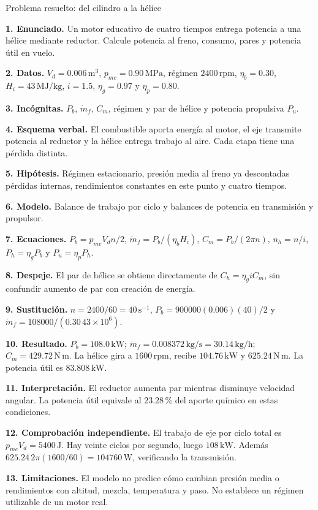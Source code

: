 \begin{studiumworked}{Problema resuelto: del cilindro a la hélice}

\textbf{1. Enunciado.} Un motor educativo de cuatro tiempos entrega potencia a una hélice mediante reductor. Calcule potencia al freno, consumo, pares y potencia útil en vuelo.

\textbf{2. Datos.} $V_d=0.006\,\mathrm{m^3}$, $p_{me}=0.90\,\mathrm{MPa}$, régimen $2400\,\mathrm{rpm}$, $\eta_b=0.30$, $H_i=43\,\mathrm{MJ/kg}$, $i=1.5$, $\eta_g=0.97$ y $\eta_p=0.80$.

\textbf{3. Incógnitas.} $P_b$, $\dot m_f$, $C_m$, régimen y par de hélice y potencia propulsiva $P_u$.

\textbf{4. Esquema verbal.} El combustible aporta energía al motor, el eje transmite potencia al reductor y la hélice entrega trabajo al aire. Cada etapa tiene una pérdida distinta.

\textbf{5. Hipótesis.} Régimen estacionario, presión media al freno ya descontadas pérdidas internas, rendimientos constantes en este punto y cuatro tiempos.

\textbf{6. Modelo.} Balance de trabajo por ciclo y balances de potencia en transmisión y propulsor.

\textbf{7. Ecuaciones.} $P_b=p_{me}V_dn/2$, $\dot m_f=P_b/(\eta_bH_i)$, $C_m=P_b/(2\pi n)$, $n_h=n/i$, $P_h=\eta_gP_b$ y $P_u=\eta_pP_h$.

\textbf{8. Despeje.} El par de hélice se obtiene directamente de $C_h=\eta_g i C_m$, sin confundir aumento de par con creación de energía.

\textbf{9. Sustitución.} $n=2400/60=40\,\mathrm{s^{-1}}$, $P_b=900000(0.006)(40)/2$ y $\dot m_f=108000/(0.30\,43\times10^6)$.

\textbf{10. Resultado.} $P_b=108.0\,\mathrm{kW}$; $\dot m_f=0.008372\,\mathrm{kg/s}=30.14\,\mathrm{kg/h}$; $C_m=429.72\,\mathrm{N\,m}$. La hélice gira a $1600\,\mathrm{rpm}$, recibe $104.76\,\mathrm{kW}$ y $625.24\,\mathrm{N\,m}$. La potencia útil es $83.808\,\mathrm{kW}$.

\textbf{11. Interpretación.} El reductor aumenta par mientras disminuye velocidad angular. La potencia útil equivale al $23.28\,\text{\%}$ del aporte químico en estas condiciones.

\textbf{12. Comprobación independiente.} El trabajo de eje por ciclo total es $p_{me}V_d=5400\,\mathrm{J}$. Hay veinte ciclos por segundo, luego $108\,\mathrm{kW}$. Además $625.24\,2\pi(1600/60)=104760\,\mathrm{W}$, verificando la transmisión.

\textbf{13. Limitaciones.} El modelo no predice cómo cambian presión media o rendimientos con altitud, mezcla, temperatura y paso. No establece un régimen utilizable de un motor real.


\end{studiumworked}

